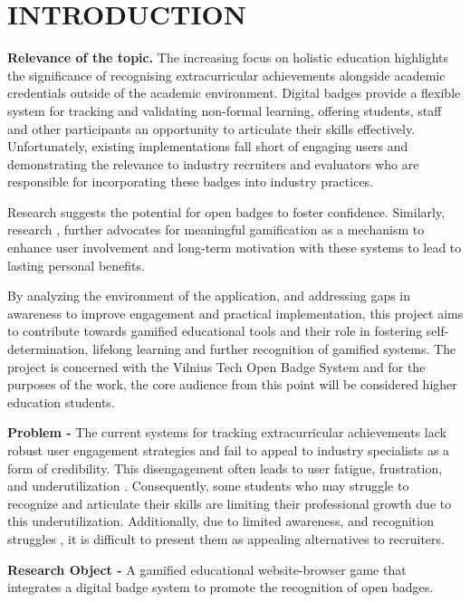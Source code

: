 \section*{INTRODUCTION}
%
\textbf{Relevance of the topic.} The increasing focus on holistic education highlights the significance of recognising extracurricular achievements alongside academic credentials outside of the academic environment. 
Digital badges provide a flexible system for tracking and validating non-formal learning, offering students, staff and other participants an opportunity to articulate their skills effectively. 
Unfortunately, existing implementations fall short of engaging users and demonstrating the relevance to industry recruiters and evaluators who are responsible for incorporating these badges into industry practices.

Research \cite {Stefaniak_and_Carey} suggests the potential for open badges to foster confidence. 
Similarly, research \cite{definition}, \cite{nicholson2015} further advocates for meaningful gamification as a mechanism to enhance user involvement and long-term motivation with these systems to lead to lasting personal benefits.

By analyzing the environment of the application, and addressing gaps in awareness to improve engagement and practical implementation, this project aims to contribute towards gamified educational tools and their role in fostering self-determination, lifelong learning and further recognition of gamified systems. 
The project is concerned with the Vilnius Tech Open Badge System and for the purposes of the work, the core audience from this point will be considered higher education students.

\textbf{Problem -} The current systems for tracking extracurricular achievements lack robust user engagement strategies and fail to appeal to industry specialists as a form of credibility.
This disengagement often leads to user fatigue, frustration, and underutilization \cite {FunaAndAaron}. 
Consequently, some students who may struggle to recognize and articulate their skills are limiting their professional growth due to this underutilization.
Additionally, due to limited awareness, and recognition struggles \cite {federalIssues}, it is difficult to present them as appealing alternatives to recruiters.

\textbf{Research Object -} A gamified educational website-browser game that integrates a digital badge system to promote the recognition of open badges.


